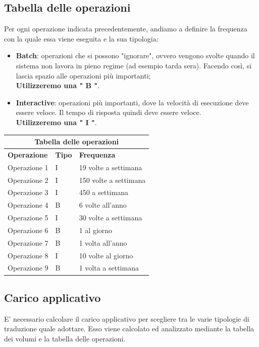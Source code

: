 \documentclass[legalpaper]{article}
\begin{document}
	\subsection{Tabella delle operazioni}
	Per ogni operazione indicata precedentemente, andiamo a definire la frequenza con la quale essa viene eseguita e la sua tipologia:
	\begin{itemize}
		\item \textbf{Batch}: operazioni che si possono "ignorare", ovvero vengono svolte quando il sistema non lavora in pieno regime (ad esempio tarda sera). Facendo così, si lascia spazio alle operazioni più importanti;\\
\textbf{Utilizzeremo una " B "}.
		\item \textbf{Interactive}: operazioni più importanti, dove la velocità di esecuzione deve essere veloce. Il tempo di risposta quindi deve essere veloce.\\
\textbf{Utilizzeremo una " I "}.
	\end{itemize}
		\renewcommand\arraystretch{2}
		\begin{tabular}{ |p{5cm}|p{2cm}|p{5cm}| }
			\hline
			\multicolumn{3}{|c|}{\textbf{Tabella delle operazioni}} \\
			\hline
			\textbf{Operazione} & \textbf{Tipo} & \textbf{Frequenza} \\
			\hline
			Operazione 1 & I &  19 volte a settimana \\ \hline
			Operazione 2 & I & 150 volte a settimana \\ \hline
			Operazione 3 & I & 450 a settimana \\ \hline
			Operazione 4 & B & 6 volte all'anno \\ \hline
			Operazione 5 & I & 30 volte a settimana \\ \hline
			Operazione 6 & B & 1 al giorno\\ \hline
			Operazione 7 & B & 1 volta all'anno \\ \hline
			Operazione 8 & I & 10 volte al giorno \\ \hline
			Operazione 9 & B & 1 volta a settimana \\ \hline
	
		
		\end{tabular}	

\subsection{Carico applicativo}
E' necessario calcolare il carico applicativo per scegliere tra le varie tipologie di traduzione quale adottare. Esso viene calcolato ed analizzato mediante la tabella dei volumi e la tabella delle operazioni.
\end{document}
